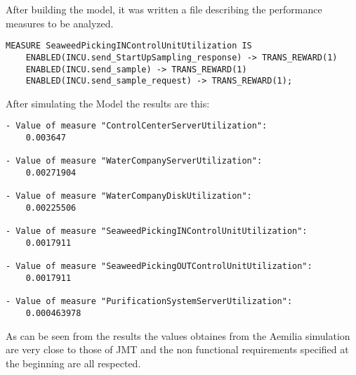 After building the model, it was written a file describing the
performance measures to be analyzed. 

\lstset {language = C}
\bigskip
\begin{lstlisting}
MEASURE SeaweedPickingINControlUnitUtilization IS
	ENABLED(INCU.send_StartUpSampling_response) -> TRANS_REWARD(1)
	ENABLED(INCU.send_sample) -> TRANS_REWARD(1)
	ENABLED(INCU.send_sample_request) -> TRANS_REWARD(1);
\end{lstlisting}

After simulating the Model the results are this:

\lstset {language = C}
\bigskip
\begin{lstlisting}
- Value of measure "ControlCenterServerUtilization":
	0.003647

- Value of measure "WaterCompanyServerUtilization":
	0.00271904

- Value of measure "WaterCompanyDiskUtilization":
	0.00225506

- Value of measure "SeaweedPickingINControlUnitUtilization":
	0.0017911

- Value of measure "SeaweedPickingOUTControlUnitUtilization":
	0.0017911

- Value of measure "PurificationSystemServerUtilization":
	0.000463978
\end{lstlisting}

As can be seen from the results the values obtaines from the Aemilia
simulation are very close to those of JMT and the non functional requirements specified at the beginning are all respected.